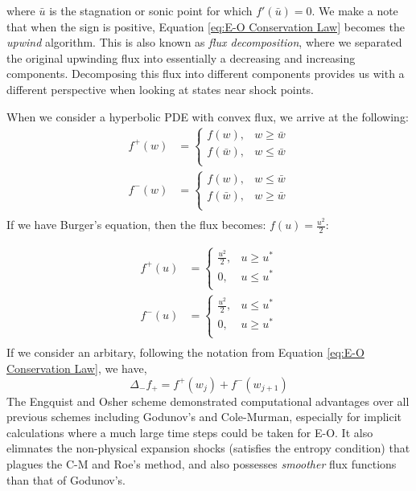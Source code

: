 \documentclass[a4paper]{article}
\numberwithin{equation}{section}
\begin{document}
where $\bar{u}$ is the stagnation or sonic point for which $f'(\bar{u}) = 0$. We make a note that when the sign is positive, Equation \ref{eq:E-O Conservation Law} becomes the \textit{upwind} algorithm. This is also known as \textit{flux decomposition}, where we separated the original upwinding flux into essentially a decreasing and increasing components. Decomposing this flux into different components provides us with a different perspective when looking at states near shock points.

When we consider a hyperbolic PDE with convex flux, we arrive at the following:
\begin{equation}
    \begin{split}
        f^+ (w) &= 
        \begin{cases}
            f(w), & w \geq \bar{w}\\
            f(\bar{w}), & w \leq \bar{w}\\
        \end{cases}\\
        f^-(w) &= 
        \begin{cases}
            f(w), & w \leq \bar{w} \\
            f(\bar{w}), & w \geq \bar{w}\\
        \end{cases}\\
    \end{split}
\end{equation}
If we have Burger's equation, then the flux becomes: $f(u) = \frac{u^2}{2}$:

\begin{equation}
    \begin{split}
        f^+ (u) &= 
        \begin{cases}
            \frac{u^2}{2}, & u \geq u^*\\
            0, & u \leq u^*\\
        \end{cases}\\
        f^-(u) &= 
        \begin{cases}
            \frac{u^2}{2}, & u \leq u^* \\
            0, & u \geq u^*\\
        \end{cases}\\
    \end{split}
\end{equation}
If we consider an arbitary, following the notation from Equation \ref{eq:E-O Conservation Law}, we have, 
\begin{equation}
    \Delta_- f_+ = f^+(w_j) + f^-({w_{j+1}})
\end{equation}
The Engquist and Osher scheme demonstrated computational advantages over all previous schemes including Godunov's and Cole-Murman, especially for implicit calculations where a much large time steps could be taken for E-O. It also elimnates the non-physical expansion shocks (satisfies the entropy condition) that plagues the C-M and Roe's method, and also possesses \textit{smoother} flux functions than that of Godunov's.
\end{document}
